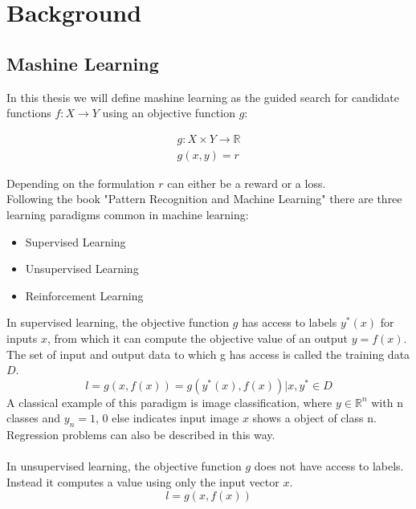 
\chapter{Background}
\label{chapter:Background}
\section{Mashine Learning}
\label{section:Learning}

In this thesis we will define mashine learning as the guided search for candidate functions ${f: X \rightarrow Y}$ using an objective function $g$:

\begin{equation}
    \begin{aligned}
    \label{ml_eq}
    g: X \times Y \to \mathbb{R} \\
    g(x,y) = r
    \end{aligned}
\end{equation}

Depending on the formulation $r$ can either be a reward or a loss.\\
Following the book "Pattern Recognition and Machine Learning" \cite{bishop} there are three learning paradigms common in machine learning: 
\begin{itemize}
	\item Supervised Learning
	\item Unsupervised Learning
	\item Reinforcement Learning
\end{itemize} 

In supervised learning, the objective function $g$ has access to labels $y^*(x)$ for inputs $x$, from which it can compute the objective value of an output 
${y = f(x)}$. The set of input and output data to which g has access is called the training data $D$. 
\begin{equation}
    \label{supervised_paradigm}
    l = g(x, f(x)) = g(y^*(x), f(x)) | x, y^* \in D
\end{equation}
A classical example of this paradigm is image classification, where $y \in \mathbb{R}^n$ with n classes and $y_n = 1$, 0 else indicates input image $x$ shows a 
object of class n. Regression problems can also be described in this way.\\ \\

In unsupervised learning, the objective function $g$ does not have access to labels. Instead it computes a value using only the input vector $x$.
\begin{equation}
    \label{unsupervised_learning_paradigm}
    l = g(x, f(x))
\end{equation}

